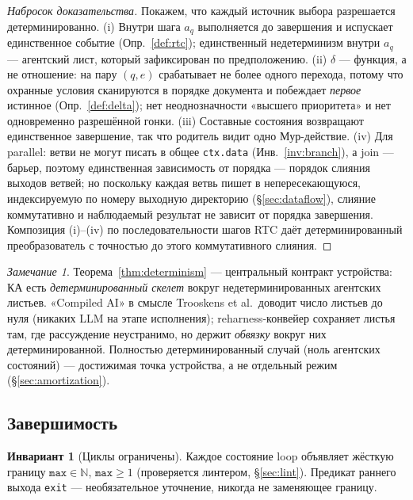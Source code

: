 \documentclass[11pt]{article}
\theoremstyle{plain}
\theoremstyle{definition}
\newtheorem{invariant}[theorem]{Инвариант}
\theoremstyle{remark}
\newtheorem{remark}[theorem]{Замечание}
\newcommand{\reharness}{\textsf{reharness}}
\newcommand{\code}[1]{\texttt{#1}}
\newcommand{\state}[1]{\textsf{#1}}
\newcommand{\transition}{\ensuremath{\delta}}
\newcommand{\Nat}{\mathbb{N}}
\begin{document}
\begin{proof}[Набросок доказательства]
Покажем, что каждый источник выбора разрешается детерминированно.
(i) Внутри шага $a_q$ выполняется до завершения и испускает единственное событие
(Опр.~\ref{def:rtc}); единственный недетерминизм внутри $a_q$ --- агентский лист, который
зафиксирован по предположению. (ii) $\transition$ --- функция, а не отношение: на пару
$(q,e)$ срабатывает не более одного перехода, потому что охранные условия сканируются в
порядке документа и побеждает \emph{первое} истинное (Опр.~\ref{def:delta}); нет
неоднозначности «высшего приоритета» и нет одновременно разрешённой гонки. (iii) Составные
состояния возвращают единственное завершение, так что родитель видит одно Мур-действие.
(iv) Для \state{parallel}: ветви не могут писать в общее \code{ctx.data}
(Инв.~\ref{inv:branch}), а join --- барьер, поэтому единственная зависимость от порядка ---
порядок слияния выходов ветвей; но поскольку каждая ветвь пишет в непересекающуюся,
индексируемую по номеру выходную директорию (\S\ref{sec:dataflow}), слияние коммутативно и
наблюдаемый результат не зависит от порядка завершения. Композиция (i)--(iv) по
последовательности шагов RTC даёт детерминированный преобразователь с точностью до этого
коммутативного слияния.
\end{proof}

\begin{remark}
Теорема~\ref{thm:determinism} --- центральный контракт устройства: КА есть
\emph{детерминированный скелет} вокруг недетерминированных агентских листьев.
«Compiled AI» в смысле Trooskens et al.\ доводит число листьев до нуля (никаких LLM на
этапе исполнения); \reharness{}-конвейер сохраняет листья там, где рассуждение
неустранимо, но держит \emph{обвязку} вокруг них детерминированной. Полностью
детерминированный случай (ноль агентских состояний) --- достижимая точка устройства, а не
отдельный режим (\S\ref{sec:amortization}).
\end{remark}

\subsection{Завершимость}

\begin{invariant}[Циклы ограничены]\label{inv:max}
Каждое состояние \state{loop} объявляет жёсткую границу $\code{max} \in \Nat$,
$\code{max} \ge 1$ (проверяется линтером, \S\ref{sec:lint}). Предикат раннего выхода
\code{exit} --- необязательное уточнение, никогда не заменяющее границу.
\end{invariant}
\end{document}
